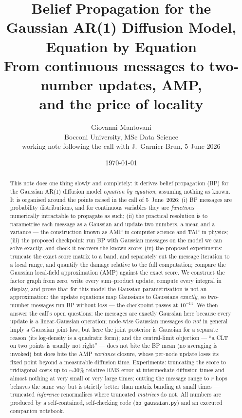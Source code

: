 \documentclass[11pt]{article}
\title{\bfseries Belief Propagation for the Gaussian AR(1) Diffusion Model,\\
Equation by Equation\\[4pt]
\large From continuous messages to two-number updates, AMP,\\
and the price of locality}
\author{Giovanni Mantovani\\[2pt]
\small Bocconi University, MSc Data Science\\[1pt]
\small working note following the call with J.~Garnier-Brun, 5 June 2026}
\date{\today}
\theoremstyle{definition}
\theoremstyle{remark}
\begin{document}
\maketitle

\begin{abstract}
\noindent
This note does one thing slowly and completely: it derives belief propagation
(BP) for the Gaussian AR(1) diffusion model \emph{equation by equation},
assuming nothing as known. It is organised around the points raised in the
call of 5~June~2026: (i) BP messages are probability distributions, and for
continuous variables they are \emph{functions} --- numerically intractable to
propagate as such; (ii) the practical resolution is to parametrise each
message as a Gaussian and update two numbers, a mean and a variance --- the
construction known as AMP in computer science and TAP in physics; (iii) the
proposed checkpoint: run BP with Gaussian messages on the model we can solve
exactly, and check it recovers the known score; (iv) the proposed
experiments: truncate the exact score matrix to a band, and separately cut
the message iteration to a local range, and quantify the damage relative to
the full computation; compare the Gaussian local-field approximation (AMP)
against the exact score. We construct the factor graph from zero, write
every sum--product update, compute every integral in display, and prove that
for this model the Gaussian parametrisation is not an approximation: the
update equations map Gaussians to Gaussians \emph{exactly}, so two-number
messages run BP without loss --- the checkpoint passes at $10^{-14}$. We
then answer the call's open questions: the messages are exactly Gaussian
here because every update is a linear-Gaussian operation; node-wise Gaussian
messages do \emph{not} in general imply a Gaussian joint law, but here the
joint posterior is Gaussian for a separate reason (its log-density is a
quadratic form); and the central-limit objection --- ``a CLT on two points is
usually not right'' --- does not bite the BP mean (no averaging is invoked)
but does bite the AMP \emph{variance} closure, whose per-node update loses
its fixed point beyond a measurable diffusion time. Experiments: truncating
the score to tridiagonal costs up to $\sim30\%$ relative RMS error at
intermediate diffusion times and almost nothing at very small or very large
times; cutting the message range to $r$ hops behaves the same way but is
strictly better than matrix banding at small times --- truncated
\emph{inference} renormalises where truncated \emph{matrices} do not. All
numbers are produced by a self-contained, self-checking code
(\texttt{bp\_gaussian.py}) and an executed companion notebook.
\end{abstract}
\end{document}

